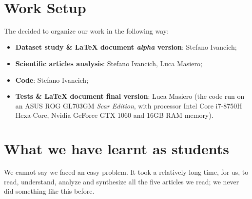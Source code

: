\documentclass[conference]{IEEEtran}
\begin{document}
\begin{table}[]
\\
\caption{Summary of the 21-commands networks performances.}
\end{table}

\newpage
\section*{Work Setup}
The decided to organize our work in the following way:
\begin{itemize}
\item \textbf{Dataset study \& \LaTeX\xspace document \textit{alpha} version}: Stefano Ivancich;
\item \textbf{Scientific articles analysis}: Stefano Ivancich, Luca Masiero;
\item \textbf{Code}: Stefano Ivancich;
\item \textbf{Tests \& \LaTeX\xspace document final version}: Luca Masiero (the code run on an ASUS ROG GL703GM \textit{Scar Edition}, with processor Intel Core i7-8750H Hexa-Core, Nvidia  GeForce GTX 1060 and 16GB RAM memory).
\end{itemize}

\section*{What we have learnt as students}
We cannot say we faced an easy problem. It took a relatively long time, for us, to read, understand, analyze and synthesize all the five articles we read; we never did something like this before. 
\end{document}
